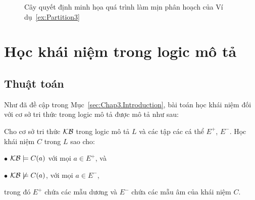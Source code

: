 \begin{figure}[h!]
	\caption{Cây quyết định minh họa quá trình làm mịn phân hoạch của Ví dụ~\ref{ex:Partition3}\label{fig:DecisionTree3}}
\end{figure}

\section{Học khái niệm trong logic mô tả}
\label{sec:Chap3.ConceptLearning}
\subsection{Thuật toán \BBCLearnS}
\label{sec:Chap3.BBCL2}

Như đã đề cập trong Mục~\ref{sec:Chap3.Introduction}, bài toán học khái niệm đối với cơ sở tri thức trong logic mô tả được mô tả như sau: 

Cho cơ sở tri thức $\mathcal{KB}$ trong logic mô tả $L$ và các tập các cá thể $E^+$, $E^-$. Học khái niệm $C$ trong $L$ sao cho:

$\bullet$ $\mathcal{KB} \models C(a)$ với mọi $a \in E^+$, và

$\bullet$ $\mathcal{KB} \not\models C(a)$, với mọi $a \in E^-$,

\noindent
trong đó $E^+$ chứa các mẫu dương và $E^-$ chứa các mẫu âm của khái niệm $C$.

